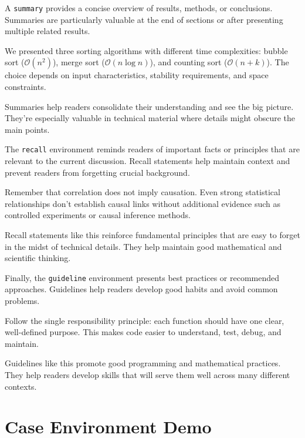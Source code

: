 \documentclass[9pt]{amsart}
\begin{document}
A \texttt{summary} provides a concise overview of results, methods, or
conclusions. Summaries are particularly valuable at the end of sections or
after presenting multiple related results.

\begin{summary}
    We presented three sorting algorithms with different time complexities: bubble sort ($\mathcal{O}(n^2)$), merge sort ($\mathcal{O}(n \log n)$), and counting sort ($\mathcal{O}(n + k)$). The choice depends on input characteristics, stability requirements, and space constraints.
\end{summary}

Summaries help readers consolidate their understanding and see the big picture.
They're especially valuable in technical material where details might obscure
the main points.

The \texttt{recall} environment reminds readers of important facts or
principles that are relevant to the current discussion. Recall statements help
maintain context and prevent readers from forgetting crucial background.

\begin{recall}
    Remember that correlation does not imply causation. Even strong statistical relationships don't establish causal links without additional evidence such as controlled experiments or causal inference methods.
\end{recall}

Recall statements like this reinforce fundamental principles that are easy to
forget in the midst of technical details. They help maintain good mathematical
and scientific thinking.

Finally, the \texttt{guideline} environment presents best practices or
recommended approaches. Guidelines help readers develop good habits and avoid
common problems.

\begin{guideline}
    Follow the single responsibility principle: each function should have one clear, well-defined purpose. This makes code easier to understand, test, debug, and maintain.
\end{guideline}

Guidelines like this promote good programming and mathematical practices. They
help readers develop skills that will serve them well across many different
contexts.

\section{Case Environment Demo}
\end{document}
